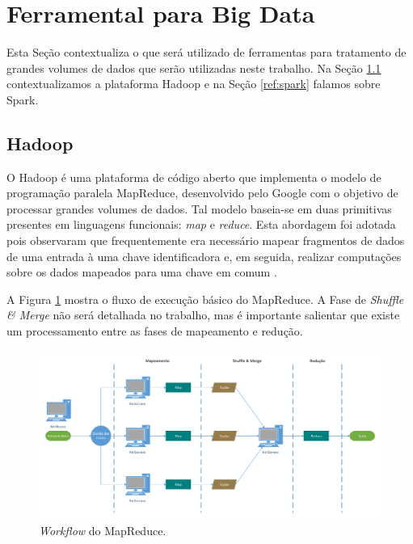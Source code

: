 \section{Ferramental para Big Data}

Esta Seção contextualiza o que será utilizado de ferramentas para 
tratamento de grandes volumes de dados que serão utilizadas neste trabalho. Na 
Seção \ref{ref:hadoop} contextualizamos a plataforma Hadoop e na Seção 
\ref{ref:spark} falamos sobre Spark.

\subsection{Hadoop} \label{ref:hadoop}





O Hadoop é uma plataforma de código aberto que implementa o modelo de 
programação paralela MapReduce, desenvolvido pelo Google com o objetivo de 
processar grandes volumes de dados. Tal modelo baseia-se em duas primitivas 
presentes em linguagens funcionais: \emph{map} e \emph{reduce}. Esta abordagem 
foi adotada pois observaram que frequentemente era necessário mapear fragmentos 
de dados de uma entrada à uma chave identificadora e, em seguida, realizar 
computações sobre os dados mapeados para uma chave em comum 
\cite{ref:mapreduce}.

A Figura \ref{fig:mrworkflow} mostra o fluxo de execução básico do MapReduce. 
A Fase de \emph{Shuffle \& Merge} não será detalhada no trabalho, mas é 
importante salientar que existe um processamento entre as fases de mapeamento e 
redução.

\begin{figure}[ht]
 \centerline{\includegraphics[width=1\textwidth]{./img/mapreduce-workflow.pdf}}
 \caption{\emph{Workflow} do MapReduce.}
 \label{fig:mrworkflow}
\end{figure}

